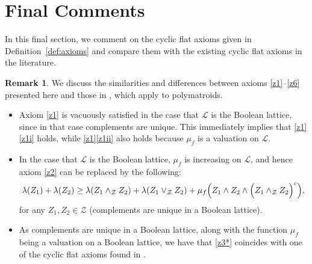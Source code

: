 \documentclass[a4paper,11pt,reqno]{article}
\theoremstyle{definition}
\newtheorem{remark}[theorem]{{{Remark}}}
\newcommand{\mL}{\mathcal{L}}
\newcommand{\mZ}{\mathcal{Z}}
\begin{document}
\section{Final Comments}\label{sec:comments}


In this final section, we comment on the cyclic flat axioms given in Definition~\ref{def:axioms} and compare them with the existing cyclic flat axioms in the literature.

\begin{remark}
    We discuss the similarities and differences between axioms \ref{z1}--\ref{z6} presented here and those in \cite[Section 3.1]{Csirm20}, which apply to polymatroids.
    \begin{itemize}
        \item Axiom \ref{z1} is vacuously satisfied in the case that $\mL$ is the Boolean lattice, since in that case complements are unique. This immediately implies that \ref{z1}\ref{z1i} holds, while \ref{z1}\ref{z1ii} also holds because $\mu_f$ is a valuation on $\mL$.
        \item In the case that $\mL$ is the Boolean lattice, $\mu_f$ is increasing on $\mL$, and hence axiom \ref{z2} can be replaced by the following:
        \[
          \lambda(Z_1)+\lambda(Z_2)\geq\lambda(Z_1\wedge_\mathcal{Z} Z_2)+\lambda(Z_1\vee_\mathcal{Z} Z_2)+\mu_f\Bigl( Z_1\wedge Z_2\wedge\Bigl(Z_1\wedge_\mathcal{Z} Z_2\Bigr)^c\Bigr),
        \]
        for any $Z_1,Z_2 \in \mZ$ (complements are unique in a Boolean lattice).
        \item As complements are unique in a Boolean lattice, along with the function $\mu_f$ being a valuation on a Boolean lattice, we have that \ref{z3*} coincides with one of the cyclic flat axioms found in \cite{Csirm20}.
    \end{itemize}
\end{remark}
\end{document}
